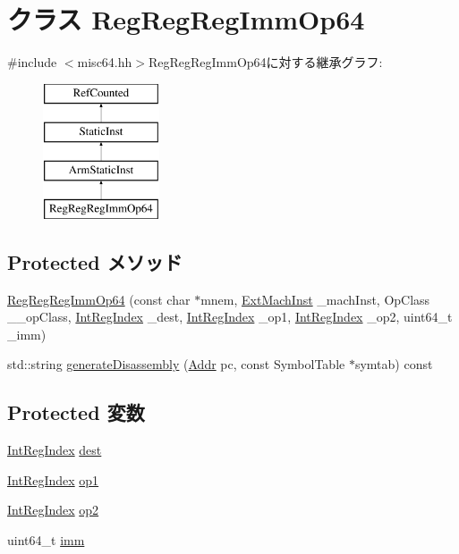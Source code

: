 \hypertarget{classRegRegRegImmOp64}{
\section{クラス RegRegRegImmOp64}
\label{classRegRegRegImmOp64}
}


{\ttfamily \#include $<$misc64.hh$>$}RegRegRegImmOp64に対する継承グラフ:\begin{figure}[H]
\begin{center}
\leavevmode
\includegraphics[height=4cm]{classRegRegRegImmOp64}
\end{center}
\end{figure}
\subsection*{Protected メソッド}
\begin{DoxyCompactItemize}
\item 
\hyperlink{classRegRegRegImmOp64_ae58b40cb80b0c25cac8d38ab91bed20b}{RegRegRegImmOp64} (const char $\ast$mnem, \hyperlink{classStaticInst_a5605d4fc727eae9e595325c90c0ec108}{ExtMachInst} \_\-machInst, OpClass \_\-\_\-opClass, \hyperlink{namespaceArmISA_ae64680ba9fb526106829d6bf92fc791b}{IntRegIndex} \_\-dest, \hyperlink{namespaceArmISA_ae64680ba9fb526106829d6bf92fc791b}{IntRegIndex} \_\-op1, \hyperlink{namespaceArmISA_ae64680ba9fb526106829d6bf92fc791b}{IntRegIndex} \_\-op2, uint64\_\-t \_\-imm)
\item 
std::string \hyperlink{classRegRegRegImmOp64_a95d323a22a5f07e14d6b4c9385a91896}{generateDisassembly} (\hyperlink{classm5_1_1params_1_1Addr}{Addr} pc, const SymbolTable $\ast$symtab) const 
\end{DoxyCompactItemize}
\subsection*{Protected 変数}
\begin{DoxyCompactItemize}
\item 
\hyperlink{namespaceArmISA_ae64680ba9fb526106829d6bf92fc791b}{IntRegIndex} \hyperlink{classRegRegRegImmOp64_aec72e8e45bdc87abeeeb75d2a8a9a716}{dest}
\item 
\hyperlink{namespaceArmISA_ae64680ba9fb526106829d6bf92fc791b}{IntRegIndex} \hyperlink{classRegRegRegImmOp64_a4c465c43ad568f8bcf8ae71480e9cfea}{op1}
\item 
\hyperlink{namespaceArmISA_ae64680ba9fb526106829d6bf92fc791b}{IntRegIndex} \hyperlink{classRegRegRegImmOp64_a7799ff6cbe5a252199059eb8665820e7}{op2}
\item 
uint64\_\-t \hyperlink{classRegRegRegImmOp64_a2b4406ad2843b5aa12d244d01d8fdc69}{imm}
\end{DoxyCompactItemize}


